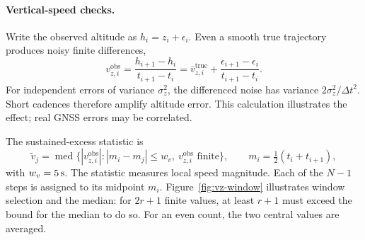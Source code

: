\begin{revblock}
\paragraph{Vertical-speed checks.}
Write the observed altitude as $h_i=z_i+\epsilon_i$. Even a smooth true trajectory
produces noisy finite differences,
\begin{equation}
 v_{z,i}^{\mathrm{obs}}=\frac{h_{i+1}-h_i}{t_{i+1}-t_i}
 =\overline v_{z,i}^{\mathrm{true}}+
   \frac{\epsilon_{i+1}-\epsilon_i}{t_{i+1}-t_i}.
 \label{eq:altitude-difference-noise}
\end{equation}
For independent errors of variance $\sigma_z^2$, the differenced noise has variance
$2\sigma_z^2/\Delta t^2$. Short cadences therefore amplify altitude error.
This calculation illustrates the effect; real GNSS errors may be correlated.

The sustained-excess statistic is
\begin{equation}
\label{eq:vzlocal}
 \tilde v_j=\operatorname{med}\{ |v_{z,i}^{\mathrm{obs}}|:
       |m_i-m_j|\le w_v,\ v_{z,i}^{\mathrm{obs}}\text{ finite}\},\qquad
 m_i=\tfrac12(t_i+t_{i+1}),
\end{equation}
with $w_v=\SI{5}{\second}$. The statistic measures local speed
magnitude. Each of the $N-1$ steps is assigned
to its midpoint $m_i$. Figure~\ref{fig:vz-window} illustrates window selection and
the median: for $2r+1$ finite values, at least $r+1$ must exceed the bound for the
median to do so. For an even count, the two central values are averaged.


\end{revblock}
